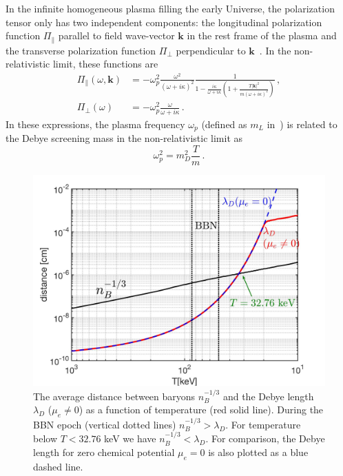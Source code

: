 In the infinite homogeneous plasma filling the early Universe, the polarization tensor only has two independent components: the longitudinal polarization function $\Pi_{\parallel}$ parallel to field wave-vector $\boldsymbol{k}$ in the rest frame of the plasma and the transverse polarization function $\Pi_{\perp}$ perpendicular to $\boldsymbol{k}$~\cite{melrose2008quantum}. In the non-relativistic limit, these functions are~\cite{Formanek:2021blc}
\begin{align}\label{eq:polfuncs}
	\Pi_\parallel(\omega,\boldsymbol{k}) &= -\omega_p^2\frac{\omega^2}{(\omega+ i \kappa)^2} \frac{1}{1-\frac{i\kappa}{\omega+ i \kappa}\left(1+\frac{ T |\boldsymbol{k}|^2}{m (\omega+ i \kappa)^2} \right)}\,,\\
	\Pi_{\perp}(\omega) &= -\omega_p^2 \frac{\omega}{\omega+ i \kappa}\,.
\end{align}
In these expressions, the plasma frequency $\omega_p$ (defined as $m_L$ in~\cite{Formanek:2021blc}) is related to the Debye screening mass in the non-relativistic limit as
\begin{equation}\label{eq:plasmafreq}
 \omega_p^2 = m_D^2\frac{T}{m}\,.
\end{equation}

\begin{figure} 
\centerline{\includegraphics[width=0.90\linewidth]{plots/chap03BBN/Distance_Plasma002.jpg}}
\caption{ The average distance between baryons $n_B^{-1/3}$ and the Debye length $\lambda_D$ ($\mu_e \neq 0$) as a function of temperature (red solid line). During the BBN epoch (vertical dotted lines) $n_B^{-1/3}>\lambda_D$. For temperature below $T<32.76$ keV we have $n_B^{-1/3}<\lambda_D$. For comparison, the Debye length for zero chemical potential $\mu_e=0$ is also plotted as a blue dashed line. }
\label{MeanFreePath_fig} 
\end{figure}

